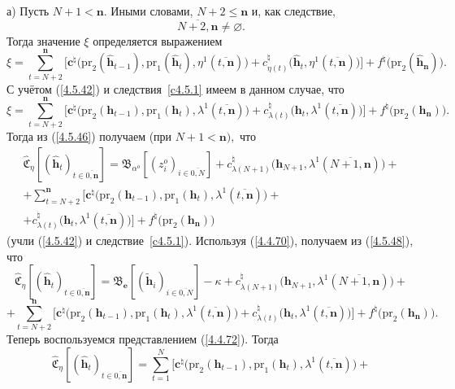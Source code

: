 \documentclass[11pt,twoside]{report}
\newcommand{\ov}{\overline}
\newcommand{\la}{\lambda}
\newcommand{\al}{\alpha}
\newcommand{\emp}{\varnothing}
\begin{document}
{{а) Пусть $N+1 <\mathbf{n}.$ Иными словами, $N+2\leqslant \mathbf{n}$ и, как следствие,
$$
\ov{N+2,\mathbf{n}}\neq \emp.
$$
Тогда значение $\xi$ определяется выражением
$$
\xi = \sum\limits_{t=N+2}^\mathbf{n}\bigl[\mathbf{c}^\natural\bigl(\mathrm{pr}_2(\hat{\mathbf{h}}_{t-1}),
\mathrm{pr}_1(\hat{\mathbf{h}}_t),\eta^1(\ov{t,\mathbf{n}})\bigl) +
c_{\eta(t)}^\natural\bigl(\hat{\mathbf{h}}_t,\eta^1(\ov{t,\mathbf{n}})\bigl)\bigl] +
f^\natural\bigl(\mathrm{pr}_2(\hat{\mathbf{h}}_\mathbf{n})\bigl).
$$
С учётом (\ref{4.5.42}) и следствия~\ref{c4.5.1} имеем в данном случае, что
$$
\xi = \sum\limits_{t=N+2}^\mathbf{n}\bigl[\mathbf{c}^\natural\bigl(\mathrm{pr}_2(\mathbf{h}_{t-1}),
\mathrm{pr}_1(\mathbf{h}_t),\la^1(\ov{t,\mathbf{n}})\bigl) +
c_{\la(t)}^\natural\bigl(\mathbf{h}_t,\la^1(\ov{t,\mathbf{n}})\bigl)\bigl] +
f^\natural\bigl(\mathrm{pr}_2(\mathbf{h}_\mathbf{n})\bigl).
$$
Тогда из (\ref{4.5.46}) получаем (при $N+1 < \mathbf{n}),$ что
\begin{eqnarray}
&\widehat{\mathfrak{C}}_\eta[(\hat{\mathbf{h}}_t)_{t\in\ov{0,\mathbf{n}}}] =
\mathfrak{B}_{\al^o}[(z_i^o)_{i\in\ov{0,N}}] +
c_{\la(N+1)}^\natural\bigl(\mathbf{h}_{N+1},\la^1(\ov{N+1,\mathbf{n}})\bigl)  +
&\nonumber\\
&+ \sum\limits_{t=N+2}^\mathbf{n}\bigl[\mathbf{c}^\natural\bigl(\mathrm{pr}_2(\mathbf{h}_{t-1}),
\mathrm{pr}_1(\mathbf{h}_t),\la^1(\ov{t,\mathbf{n}})\bigl) +
&\nonumber\\
&+ c_{\la(t)}^\natural\bigl(\mathbf{h}_t,\la^1(\ov{t,\mathbf{n}})\bigl)\bigl] +
f^\natural\bigl(\mathrm{pr}_2(\mathbf{h}_\mathbf{n})\bigl)
&\label{4.5.48}
\end{eqnarray}
(учли (\ref{4.5.42}) и следствие~\ref{c4.5.1}).  Используя (\ref{4.4.70}),
получаем из (\ref{4.5.48}), что
$$
\widehat{\mathfrak{C}}_\eta[(\hat{\mathbf{h}}_t)_{t\in\ov{0,\mathbf{n}}}] =
\mathfrak{B}_\mathbf{e}[(\tilde{\mathbf{h}}_i)_{i\in\ov{0,N}}] -\kappa +
c_{\la(N+1)}^\natural\bigl(\mathbf{h}_{N+1},\la^1(\ov{N+1,\mathbf{n}})\bigl) +
$$
$$
+ \sum\limits_{t=N+2}^\mathbf{n}\bigl[\mathbf{c}^\natural\bigl(\mathrm{pr}_2(\mathbf{h}_{t-1}),
\mathrm{pr}_1(\mathbf{h}_t),\la^1(\ov{t,\mathbf{n}})\bigl) +
c_{\la(t)}^\natural\bigl(\mathbf{h}_t,\la^1(\ov{t,\mathbf{n}})\bigl)\bigl] +
f^\natural\bigl(\mathrm{pr}_2(\mathbf{h}_\mathbf{n})\bigl).
$$
Теперь воспользуемся  представлением (\ref{4.4.72}). Тогда
$$
\widehat{\mathfrak{C}}_\eta[(\hat{\mathbf{h}}_t)_{t\in\ov{0,\mathbf{n}}}] =
\sum\limits_{t=1}^N\bigl[\mathbf{c}^\natural\bigl(\mathrm{pr}_2(\mathbf{h}_{t-1}),
\mathrm{pr}_1(\mathbf{h}_t),\la^1(\ov{t,\mathbf{n}})\bigl) +
$$}}
\end{document}
